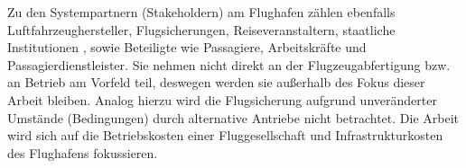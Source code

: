 Zu den Systempartnern (Stakeholdern) am Flughafen zählen ebenfalls Luftfahrzeughersteller, Flugsicherungen, 
Reiseveranstaltern, staatliche Institutionen \cite{maertens2023neue},
sowie Beteiligte wie Passagiere, Arbeitskräfte und Passagierdienstleister. 
Sie nehmen nicht direkt an der Flugzeugabfertigung bzw. an Betrieb am Vorfeld teil, deswegen werden sie außerhalb des Fokus dieser Arbeit bleiben.
Analog hierzu wird die Flugsicherung aufgrund unveränderter Umstände (Bedingungen) durch alternative Antriebe nicht betrachtet. 
Die Arbeit wird sich auf die Betriebskosten einer Fluggesellschaft und Infrastrukturkosten des Flughafens fokussieren.
%
%
%
%
%
%
%
%
%